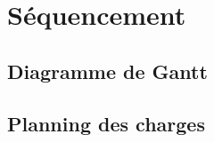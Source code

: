 \section{Séquencement}
	\label{sec:sequencement}

	\subsection{Diagramme de Gantt}

	\subsection{Planning des charges}